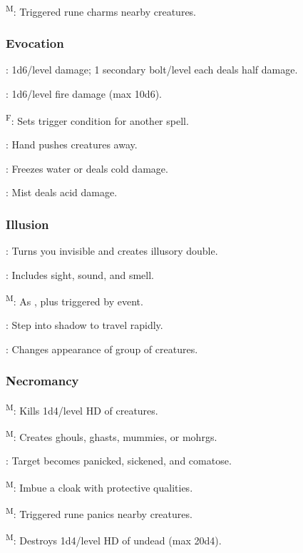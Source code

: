 	\textsuperscript{M}: Triggered rune charms nearby creatures.

\subsubsection{Evocation}
	: 1d6/level damage; 1 secondary bolt/level each deals half damage.

	: 1d6/level fire damage (max 10d6). %

	\textsuperscript{F}: Sets trigger condition for another spell.

	: Hand pushes creatures away.

	: Freezes water or deals cold damage.

	: Mist deals acid damage. %

\subsubsection{Illusion}
	: Turns you invisible and creates illusory double.

	: Includes sight, sound, and smell.

	\textsuperscript{M}: As , plus triggered by event.

	: Step into shadow to travel rapidly.

	: Changes appearance of group of creatures.

\subsubsection{Necromancy}
	\textsuperscript{M}: Kills 1d4/level HD of creatures.

	\textsuperscript{M}: Creates ghouls, ghasts, mummies, or mohrgs.

	: Target becomes panicked, sickened, and comatose.

	\textsuperscript{M}: Imbue a cloak with protective qualities. %

	\textsuperscript{M}: Triggered rune panics nearby creatures.

	\textsuperscript{M}: Destroys 1d4/level HD of undead (max 20d4).


